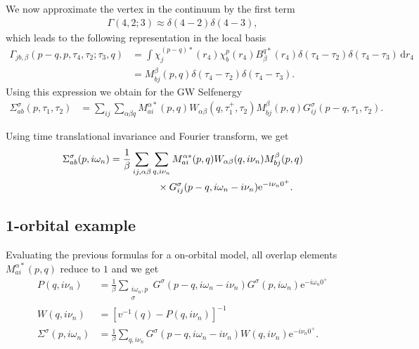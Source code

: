 \documentclass[12pt,a4paper]{scrartcl}
\numberwithin{equation}{section}
\begin{document}
We now approximate the vertex in the continuum by the first term
\begin{align}
 \Gamma(4,2;3) \approx \delta(4-2)\delta(4-3) , 
\end{align}
 which leads to the following representation in
 the local basis
\begin{align}
\Gamma_{jb,\beta}(p-q,p,\tau_4,\tau_2;\tau_3,q)
&= \int \chi^{(p-q)*}_{j}(r_4) \chi^p_{b}(r_4) B^{q*}_{\beta}(r_4)
    \delta(\tau_4-\tau_2)\delta(\tau_4-\tau_3)\, \mathrm{d}r_4 \\
%
&= M^{\beta}_{bj}(p,q)   \delta(\tau_4-\tau_2)\delta(\tau_4-\tau_3).
\end{align}
Using this expression we obtain for the GW Selfenergy
\begin{align}
\Sigma^{\sigma}_{ab}(p,\tau_1,\tau_2)
%
&= \sum_{ij}\sum_{\alpha\beta q}  M^{\alpha*}_{ai}(p,q)  W_{\alpha\beta}(q,\tau_1^+,\tau_2)  
                                  M^{\beta}_{bj}(p,q) G^{\sigma}_{ij}(p-q,\tau_1,\tau_2) .
\end{align}


Using time translational invariance and Fourier transform,
we get
\begin{align}
\Sigma^{\sigma}_{ab}(p,i\omega_n)
%
&= \frac{1}{\beta}\sum_{ij,\alpha\beta}\sum_{q,i\nu_n}  M^{\alpha*}_{ai}(p,q)  W_{\alpha\beta}(q,i\nu_n)  
                                  M^{\beta}_{bj}(p,q)    \nonumber \\
& \hspace{1.7cm} \times G^{\sigma}_{ij}(p-q,i\omega_n-i\nu_n) \mathrm{e}^{-i\nu_n0^+} .
\end{align}

\subsection{1-orbital example}
Evaluating the previous formulas for a on-orbital model,
all overlap elements $M^{\alpha*}_{ai}(p,q)$ reduce to $1$ and 
we get
\begin{align}
 P(q,i\nu_n)
&= \frac{1}{\beta}\sum_{\substack{i\omega_n,p\\ \sigma}} G^{\sigma}(p-q,i\omega_n-i\nu_n) G^{\sigma}(p,i\omega_n) \mathrm{e}^{-i\omega_n 0^+} \\
%
W(q,i\nu_n)
&= \left[ v^{-1}(q) - P(q,i\nu_n) \right]^{-1} \\
%
\Sigma^{\sigma}(p,i\omega_n)
&=\frac{1}{\beta}\sum_{q,i\nu_n} G^{\sigma}(p-q,i\omega_n-i\nu_n) W(q,i\nu_n) \mathrm{e}^{-i\nu_n0^+} .
\end{align}
\end{document}
